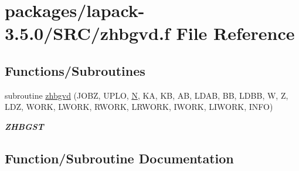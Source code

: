 \hypertarget{zhbgvd_8f}{}\section{packages/lapack-\/3.5.0/\+S\+R\+C/zhbgvd.f File Reference}
\label{zhbgvd_8f}
\subsection*{Functions/\+Subroutines}
\begin{DoxyCompactItemize}
\item 
subroutine \hyperlink{zhbgvd_8f_a597ea234c22684386ad82c7515285514}{zhbgvd} (J\+O\+B\+Z, U\+P\+L\+O, \hyperlink{polmisc_8c_a0240ac851181b84ac374872dc5434ee4}{N}, K\+A, K\+B, A\+B, L\+D\+A\+B, B\+B, L\+D\+B\+B, W, Z, L\+D\+Z, W\+O\+R\+K, L\+W\+O\+R\+K, R\+W\+O\+R\+K, L\+R\+W\+O\+R\+K, I\+W\+O\+R\+K, L\+I\+W\+O\+R\+K, I\+N\+F\+O)
\begin{DoxyCompactList}\small\item\em {\bfseries Z\+H\+B\+G\+S\+T} \end{DoxyCompactList}\end{DoxyCompactItemize}


\subsection{Function/\+Subroutine Documentation}
\hypertarget{zhbgvd_8f_a597ea234c22684386ad82c7515285514}{}
